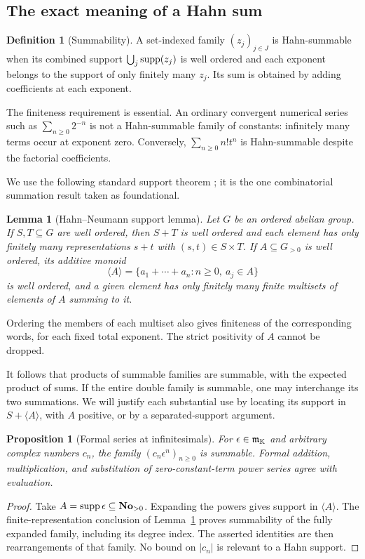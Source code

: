 \documentclass[11pt,a4paper]{article}
\newtheorem{proposition}[theorem]{Proposition}
\newtheorem{lemma}[theorem]{Lemma}
\theoremstyle{definition}\newtheorem{definition}[theorem]{Definition}
\theoremstyle{remark}\newtheorem{remark}[theorem]{Remark}
\newcommand{\No}{\mathbf{No}}
\numberwithin{equation}{section}
\begin{document}
\subsection{The exact meaning of a Hahn sum}
\begin{definition}[Summability]
A set-indexed family $(z_j)_{j\in J}$ is Hahn-summable when its combined support
$\bigcup_j\operatorname{supp}(z_j)$ is well ordered and each exponent belongs to the support of only finitely many $z_j$. Its sum is obtained by adding coefficients at each exponent.
\end{definition}
The finiteness requirement is essential. An ordinary convergent numerical series such as $\sum_{n\geq0}2^{-n}$ is not a Hahn-summable family of constants: infinitely many terms occur at exponent zero. Conversely, $\sum_{n\geq0}n!t^n$ is Hahn-summable despite the factorial coefficients.

We use the following standard support theorem \cite{Neumann}; it is the one combinatorial summation result taken as foundational.
\begin{lemma}[Hahn--Neumann support lemma]\label{lem:neumann}
Let $G$ be an ordered abelian group. If $S,T\subseteq G$ are well ordered, then $S+T$ is well ordered and each element has only finitely many representations $s+t$ with $(s,t)\in S\times T$. If $A\subseteq G_{>0}$ is well ordered, its additive monoid
\[
 \langle A\rangle=\{a_1+\cdots+a_n:n\geq0,\ a_j\in A\}
\]
is well ordered, and a given element has only finitely many finite multisets of elements of $A$ summing to it.
\end{lemma}
Ordering the members of each multiset also gives finiteness of the corresponding words, for each fixed total exponent. The strict positivity of $A$ cannot be dropped.

It follows that products of summable families are summable, with the expected product of sums. If the entire double family is summable, one may interchange its two summations. We will justify each substantial use by locating its support in $S+\langle A\rangle$, with $A$ positive, or by a separated-support argument.

\begin{proposition}[Formal series at infinitesimals]\label{prop:complexcoeff}
For $\epsilon\in\mathfrak m_{\mathbb K}$ and arbitrary complex numbers $c_n$, the family $(c_n\epsilon^n)_{n\geq0}$ is summable. Formal addition, multiplication, and substitution of zero-constant-term power series agree with evaluation.
\end{proposition}
\begin{proof}
Take $A=\supp\epsilon\subseteq\No_{>0}$. Expanding the powers gives support in $\langle A\rangle$. The finite-representation conclusion of Lemma~\ref{lem:neumann} proves summability of the fully expanded family, including its degree index. The asserted identities are then rearrangements of that family. No bound on $|c_n|$ is relevant to a Hahn support.
\end{proof}
\end{document}
